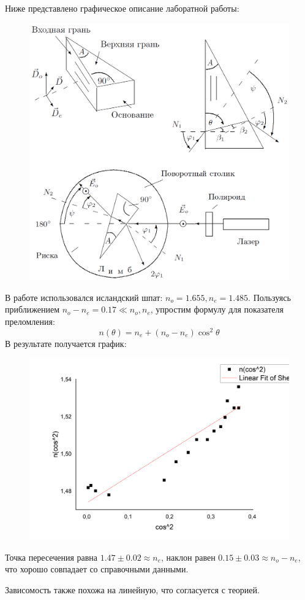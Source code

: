 \documentclass[a4paper,12pt]{article}
\begin{document}
Ниже представлено графическое описание лаборатной работы:	
\begin{figure}[h!]
	\begin{center}
		\includegraphics[scale = 0.7]{2.png}
	\end{center}
\end{figure}
 \newpage
 В работе использовался исландский шпат: $n_o = 1.655, n_e = 1.485$. Пользуясь приближением ${n_o} - {n_e} = 0.17 \ll {n_o},{n_e}$, упростим формулу для показателя преломления:
 \[n(\theta ) = {n_e} + ({n_o} - {n_e}){\cos ^2}\theta \]
 В результате получается график: 
 \begin{figure}[h!]
 	\begin{center}
 		\includegraphics[scale = 0.4]{3.png}
 	\end{center}
 \end{figure}

Точка пересечения равна $1.47 \pm 0.02 \approx n_e$, наклон равен $0.15 \pm 0.03 \approx n_o-n_e$, что хорошо совпадает со справочными данными.

Зависомость также похожа на линейную, что согласуется с теорией.  
\end{document}
